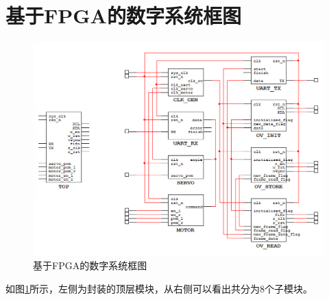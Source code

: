 \documentclass[a4paper]{paper}
\begin{document}
\section{基于FPGA的数字系统框图}
\begin{figure}
    \centering
    \includegraphics[width=\textwidth]{FPGABlockDesign.png}
    \caption{基于FPGA的数字系统框图}
    \label{FPGABlockDesign}
\end{figure}
如图\ref{FPGABlockDesign}所示，左侧为封装的顶层模块，从右侧可以看出共分为8个子模块。
\end{document}
